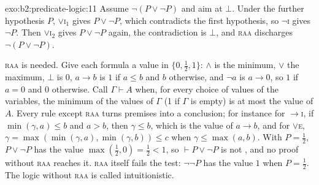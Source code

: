 \begin{solution}{exo:b2:predicate-logic:11}
Assume $\neg(P \vee \neg P)$ and aim at $\bot$. Under the further hypothesis $P$, $\vee$\textsc{i}$_1$ gives $P \vee
\neg P$, which contradicts the first hypothesis, so $\neg$\textsc{i} gives $\neg P$. Then $\vee$\textsc{i}$_2$ gives $P
\vee \neg P$ again, the contradiction is $\bot$, and \textsc{raa} discharges $\neg(P \vee \neg P)$.


\textsc{raa} is needed. Give each formula a value in $\{0, \tfrac12, 1\}$: $\wedge$ is the minimum, $\vee$ the maximum,
$\bot$ is $0$, $a \to b$ is $1$ if $a \leq b$ and $b$ otherwise, and $\neg a$ is $a \to 0$, so $1$ if $a = 0$ and $0$
otherwise. Call $\Gamma \vdash A$ \emph{} when, for every choice of values of the variables, the minimum of the
values of $\Gamma$ (1 if $\Gamma$ is empty) is at most the value of $A$. Every rule except \textsc{raa} turns 
premises into a  conclusion; for instance for $\to$\textsc{i}, if $\min(\gamma, a) \leq b$ and $a > b$, then
$\gamma \leq b$, which is the value of $a \to b$, and for $\vee$\textsc{e}, $\gamma = \max(\min(\gamma, a), \min(\gamma,
b)) \leq c$ when $\gamma \leq \max(a, b)$. With $P = \tfrac12$, $P \vee \neg P$ has the value $\max(\tfrac12, 0) =
\tfrac12 < 1$, so $\vdash P \vee \neg P$ is not , and no proof without \textsc{raa} reaches it. \textsc{raa} itself
fails the test: $\neg\neg P$ has the value $1$ when $P = \tfrac12$. The logic without \textsc{raa} is called
intuitionistic.
\end{solution}

